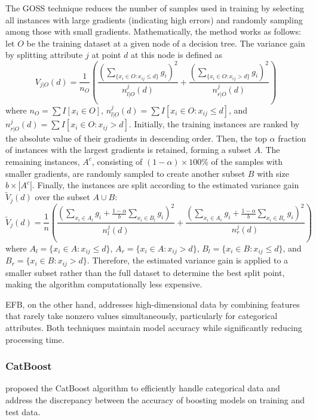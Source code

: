 The GOSS technique reduces the number of samples used in training by selecting all instances with large gradients (indicating high errors) and randomly sampling among those with small gradients. Mathematically, the method works as follows: let $O$ be the training dataset at a given node of a decision tree. The variance gain by splitting attribute $j$ at point $d$ at this node is defined as
\begin{equation}
    V_{j|O}(d) = \frac{1}{n_O}\left(
                    \frac{(\sum_{\{x_i \in O:x_{ij} \leq d\}}g_i)^2}{n_{l|O}^j(d)} +
                    \frac{(\sum_{\{x_i \in O:x_{ij} > d\}}g_i)^2}{n_{r|O}^j(d)} \right)
\end{equation}
where $n_O = \sum I[x_i \in O]$, $n_{l|O}^j(d) = \sum I[x_i \in O: x_{ij} \leq d]$, and $n_{r|O}^j(d) = \sum I[x_i \in O: x_{ij} > d]$. Initially, the training instances are ranked by the absolute value of their gradients in descending order. Then, the top $\alpha$ fraction of instances with the largest gradients is retained, forming a subset $A$. The remaining instances, $A^c$, consisting of $(1-\alpha)\times 100\%$ of the samples with smaller gradients, are randomly sampled to create another subset $B$ with size $b\times|A^c|$. Finally, the instances are split according to the estimated variance gain $\tilde{V}_{j}(d)$ over the subset $A \cup B$:
\begin{equation}
    \tilde{V}_{j}(d) = \frac{1}{n}\left(
                    \frac{(\sum_{x_i \in A_l}g_i + \frac{1-\alpha}{b}\sum_{x_i \in B_l}g_i)^2}{n_{l}^j(d)} +
                    \frac{(\sum_{x_i \in A_r}g_i + \frac{1-\alpha}{b}\sum_{x_i \in B_r}g_i)^2}{n_{r}^j(d)} 
                    \right)
\end{equation}
where $A_{l} = \{x_i \in A : x_{ij} \leq d\}$, $A_{r} = \{x_i \in A : x_{ij} > d\}$, $B_{l} = \{x_i \in B : x_{ij} \leq d\}$, and $B_{r} = \{x_i \in B : x_{ij} > d\}$. Therefore, the estimated variance gain is applied to a smaller subset rather than the full dataset to determine the best split point, making the algorithm computationally less expensive.

EFB, on the other hand, addresses high-dimensional data by combining features that rarely take nonzero values simultaneously, particularly for categorical attributes. Both techniques maintain model accuracy while significantly reducing processing time.

\subsubsection{CatBoost}
\cite{prokhorenkova2018catboost} proposed the CatBoost algorithm to efficiently handle categorical data and address the discrepancy between the accuracy of boosting models on training and test data.

